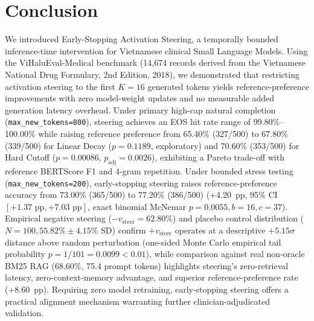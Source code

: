 \section{Conclusion}
We introduced Early-Stopping Activation Steering, a temporally bounded inference-time intervention for Vietnamese clinical Small Language Models. Using the ViHaluEval-Medical benchmark (14,674 records derived from the Vietnamese National Drug Formulary, 2nd Edition, 2018), we demonstrated that restricting activation steering to the first $K=16$ generated tokens yields reference-preference improvements with zero model-weight updates and no measurable added generation latency overhead. Under primary high-cap natural completion (\texttt{max\_new\_tokens=800}), steering achieves an EOS hit rate range of 99.80\%--100.00\% while raising reference preference from 65.40\% (327/500) to 67.80\% (339/500) for Linear Decay ($p=0.1189$, exploratory) and 70.60\% (353/500) for Hard Cutoff ($p=0.00086$, $p_{\text{adj}}=0.0026$), exhibiting a Pareto trade-off with reference BERTScore F1 and 4-gram repetition. Under bounded stress testing (\texttt{max\_new\_tokens=200}), early-stopping steering raises reference-preference accuracy from 73.00\% (365/500) to 77.20\% (386/500) (+4.20~pp, 95\% CI $[+1.37\text{ pp}, +7.03\text{ pp}]$, exact binomial McNemar $p=0.0055, b=16, c=37$). Empirical negative steering ($-v_{\text{steer}}=62.80\%$) and placebo control distribution ($N=100, 55.82\%\pm4.15\%$ SD) confirm $+v_{\text{steer}}$ operates at a descriptive $+5.15\sigma$ distance above random perturbation (one-sided Monte Carlo empirical tail probability $p=1/101=0.0099 < 0.01$), while comparison against real non-oracle BM25 RAG (68.60\%, 75.4 prompt tokens) highlights steering's zero-retrieval latency, zero-context-memory advantage, and superior reference-preference rate (+8.60~pp). Requiring zero model retraining, early-stopping steering offers a practical alignment mechanism warranting further clinician-adjudicated validation.

